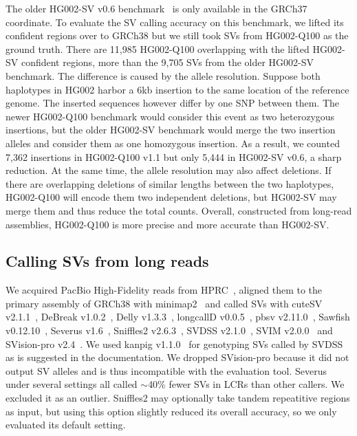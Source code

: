 \documentclass[a4paper,num-refs]{oup-contemporary}
\begin{document}
The older HG002-SV v0.6 benchmark~\cite{Zook:2020aa} is only available in the GRCh37 coordinate.
To evaluate the SV calling accuracy on this benchmark,
we lifted its confident regions over to GRCh38
but we still took SVs from HG002-Q100 as the ground truth.
There are 11,985 HG002-Q100 overlapping with the lifted HG002-SV confident regions,
more than the 9,705 SVs from the older HG002-SV benchmark.
The difference is caused by the allele resolution.
Suppose both haplotypes in HG002 harbor a 6kb insertion to the same location of the reference genome.
The inserted sequences however differ by one SNP between them.
The newer HG002-Q100 benchmark
would consider this event as two heterozygous insertions,
but the older HG002-SV benchmark would merge the two insertion alleles and consider them as one homozygous insertion.
As a result, we counted 7,362 insertions in HG002-Q100 v1.1 but only 5,444 in HG002-SV v0.6, a sharp reduction.
At the same time, the allele resolution may also affect deletions.
If there are overlapping deletions of similar lengths between the two haplotypes,
HG002-Q100 will encode them two independent deletions,
but HG002-SV may merge them and thus reduce the total counts.
Overall, constructed from long-read assemblies, HG002-Q100 is more precise and more accurate than HG002-SV.

\subsection{Calling SVs from long reads}

We acquired PacBio High-Fidelity reads from HPRC~\cite{hifi-read},
aligned them to the primary assembly of GRCh38 with minimap2~\cite{Li:2018ab}
and called SVs with
cuteSV v2.1.1~\cite{Jiang:2020aa},
DeBreak v1.0.2~\cite{Chen:2023aa},
Delly v1.3.3~\cite{Rausch:2012aa},
longcallD v0.0.5~\cite{longcalld},
pbsv v2.11.0~\cite{pbsv},
Sawfish v0.12.10~\cite{Saunders:2025aa},
Severus v1.6~\cite{Keskus:2025aa},
Sniffles2 v2.6.3~\cite{Smolka:2024ab},
SVDSS v2.1.0~\cite{Denti:2023aa},
SVIM v2.0.0~\cite{Heller:2019aa}
and SVision-pro v2.4~\cite{Wang:2025aa}.
We used kanpig v1.1.0~\cite{English:2025aa} for genotyping SVs called by SVDSS as is suggested in the documentation.
We dropped SVision-pro because it did not output SV alleles and is thus incompatible with the evaluation tool.
Severus under several settings all called $\sim$40\% fewer SVs in LCRs than other callers.
We excluded it as an outlier.
Sniffles2 may optionally take tandem repeatitive regions as input,
but using this option slightly reduced its overall accuracy, so we only evaluated its default setting.
\end{document}
